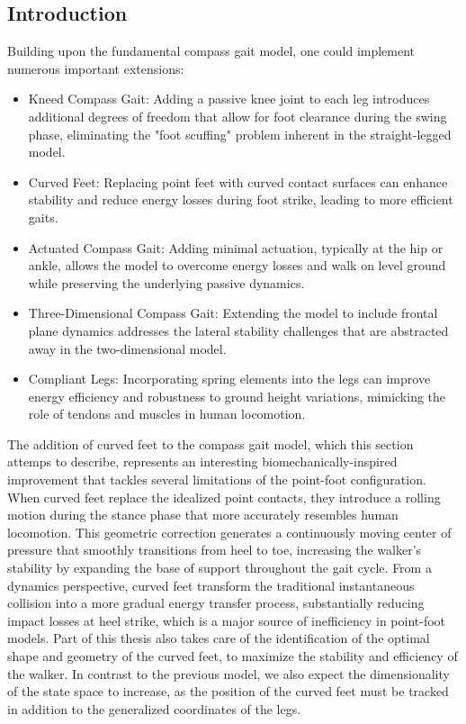 \subsection{Introduction}
Building upon the fundamental compass gait model, one could implement numerous important extensions:

\begin{itemize}
    \item Kneed Compass Gait: Adding a passive knee joint to each leg introduces additional degrees of freedom that allow for foot clearance during the swing phase, eliminating the "foot scuffing" problem inherent in the straight-legged model.
    \item Curved Feet: Replacing point feet with curved contact surfaces can enhance stability and reduce energy losses during foot strike, leading to more efficient gaits.
    \item Actuated Compass Gait: Adding minimal actuation, typically at the hip or ankle, allows the model to overcome energy losses and walk on level ground while preserving the underlying passive dynamics.
    \item Three-Dimensional Compass Gait: Extending the model to include frontal plane dynamics addresses the lateral stability challenges that are abstracted away in the two-dimensional model.
    \item Compliant Legs: Incorporating spring elements into the legs can improve energy efficiency and robustness to ground height variations, mimicking the role of tendons and muscles in human locomotion.
\end{itemize}

The addition of curved feet to the compass gait model, which this section attemps to describe, represents an interesting biomechanically-inspired improvement that tackles several limitations of the point-foot configuration.
When curved feet replace the idealized point contacts, they introduce a rolling motion during the stance phase that more accurately resembles human locomotion.
This geometric correction generates a continuously moving center of pressure that smoothly transitions from heel to toe, increasing the walker's stability by expanding the base of support throughout the gait cycle.
From a dynamics perspective, curved feet transform the traditional instantaneous collision into a more gradual energy transfer process, substantially reducing impact losses at heel strike, which is a major source of inefficiency in point-foot models.
Part of this thesis also takes care of the identification of the optimal shape and geometry of the curved feet, to maximize the stability and efficiency of the walker.
In contrast to the previous model, we also expect the dimensionality of the state space to increase, as the position of the curved feet must be tracked in addition to the generalized coordinates of the legs.

